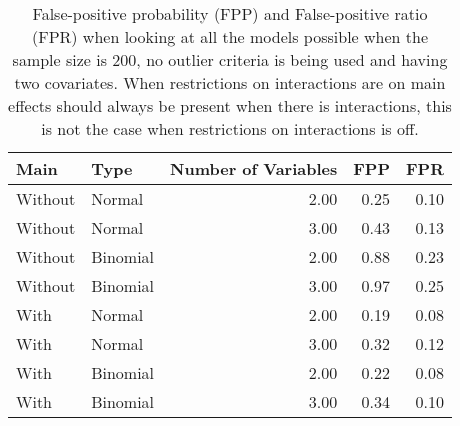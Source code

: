 \begin{table}[ht]
\centering
\caption{False-positive probability (FPP) and False-positive ratio (FPR) when looking at all the models possible when the sample size is 200, no outlier criteria is being used and having two covariates. When restrictions on interactions are on main effects should always be present when there is interactions, this is not the case when restrictions on interactions is off.} 
\label{tab:resultFull}
\begin{tabular}{llrrr}
  \hline
Main & Type & Number of Variables & FPP & FPR \\ 
  \hline
Without & Normal & 2.00 & 0.25 & 0.10 \\ 
  Without & Normal & 3.00 & 0.43 & 0.13 \\ 
  Without & Binomial & 2.00 & 0.88 & 0.23 \\ 
  Without & Binomial & 3.00 & 0.97 & 0.25 \\ 
  With & Normal & 2.00 & 0.19 & 0.08 \\ 
  With & Normal & 3.00 & 0.32 & 0.12 \\ 
  With & Binomial & 2.00 & 0.22 & 0.08 \\ 
  With & Binomial & 3.00 & 0.34 & 0.10 \\ 
   \hline
\end{tabular}
\end{table}
